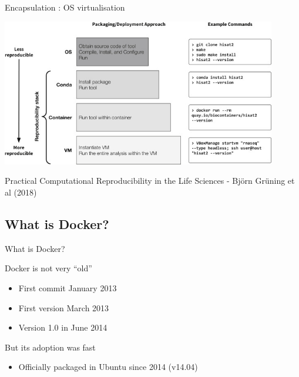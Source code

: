 \begin{frame}{Encapsulation : OS virtualisation}

\centering\includegraphics[width=12cm]{02_encapsulation/images/encapsulation_reproducibility_scale.png}

Practical Computational Reproducibility in the Life Sciences - Björn Grüning et al (2018) 

\end{frame}


\subsection{What is Docker?}

\begin{frame}{What is Docker?}

Docker is not very “old”
\begin{itemize}
  \item First commit January 2013
  \item First version March 2013
  \item Version 1.0 in June 2014
\end{itemize}

But its adoption was fast
\begin{itemize}
  \item Officially packaged in Ubuntu since 2014 (v14.04) 
\end{itemize}

\end{frame}

